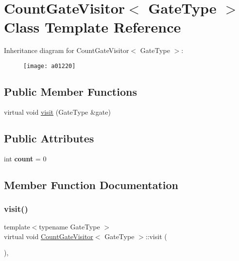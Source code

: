 \hypertarget{a01220}{}\section{Count\+Gate\+Visitor$<$ Gate\+Type $>$ Class Template Reference}
\label{a01220}
Inheritance diagram for Count\+Gate\+Visitor$<$ Gate\+Type $>$\+:\begin{figure}[H]
\begin{center}
\leavevmode
\texttt{[image: a01220]}
\end{center}
\end{figure}
\subsection*{Public Member Functions}
\begin{DoxyCompactItemize}
\item 
virtual void \hyperlink{a01220_a144f1e4e6d24c450e0a941fa650c1f48}{visit} (Gate\+Type \&gate)
\end{DoxyCompactItemize}
\subsection*{Public Attributes}
\begin{DoxyCompactItemize}
\item 
\mbox{\label{a01220_a74c1ba58befe42d9dbdbd5eb14aa46ca}} 
int {\bfseries count} = 0
\end{DoxyCompactItemize}


\subsection{Member Function Documentation}
\mbox{\label{a01220_a144f1e4e6d24c450e0a941fa650c1f48}} 
\subsubsection{\texorpdfstring{visit()}{visit()}}
{\footnotesize\ttfamily template$<$typename Gate\+Type $>$ \\
virtual void \hyperlink{a01220}{Count\+Gate\+Visitor}$<$ Gate\+Type $>$\+::visit (\begin{DoxyParamCaption}\item[{Gate\+Type \&}]{ }\end{DoxyParamCaption})\hspace{0.3cm}{\ttfamily [inline]}, {\ttfamily [virtual]}}


